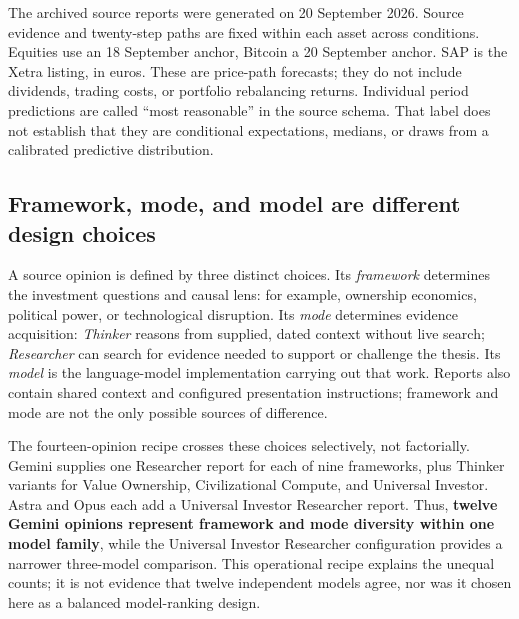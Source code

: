 \documentclass[11pt]{article}
\begin{document}
The archived source reports were generated on 20 September 2026. Source evidence and twenty-step paths are fixed within each asset across conditions. Equities use an 18 September anchor, Bitcoin a 20 September anchor. SAP is the Xetra listing, in euros. These are price-path forecasts; they do not include dividends, trading costs, or portfolio rebalancing returns. Individual period predictions are called ``most reasonable'' in the source schema. That label does not establish that they are conditional expectations, medians, or draws from a calibrated predictive distribution.

\subsection{Framework, mode, and model are different design choices}
A source opinion is defined by three distinct choices. Its \emph{framework} determines the investment questions and causal lens: for example, ownership economics, political power, or technological disruption. Its \emph{mode} determines evidence acquisition: \emph{Thinker} reasons from supplied, dated context without live search; \emph{Researcher} can search for evidence needed to support or challenge the thesis. Its \emph{model} is the language-model implementation carrying out that work. Reports also contain shared context and configured presentation instructions; framework and mode are not the only possible sources of difference.

The fourteen-opinion recipe crosses these choices selectively, not factorially. Gemini supplies one Researcher report for each of nine frameworks, plus Thinker variants for Value Ownership, Civilizational Compute, and Universal Investor. Astra and Opus each add a Universal Investor Researcher report. Thus, \textbf{twelve Gemini opinions represent framework and mode diversity within one model family}, while the Universal Investor Researcher configuration provides a narrower three-model comparison. This operational recipe explains the unequal counts; it is not evidence that twelve independent models agree, nor was it chosen here as a balanced model-ranking design.
\end{document}
